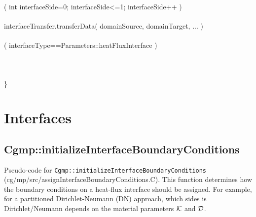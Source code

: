 \begin{flushleft}
\ia {} \\
\ia \FOR( int interfaceSide=0; interfaceSide<=1; interfaceSide++ ) \\
\ib \\
\ib    interfaceTransfer.transferData( domainSource, domainTarget,  ... ) \\
\ib \\
\ib    \IF( interfaceType==Parameters::heatFluxInterface ) \\
\ic      {} \\
\ib    \END \\
\ia \END \\
\}
\end{flushleft}


\clearpage
\section{Interfaces }

\subsection{Cgmp::initializeInterfaceBoundaryConditions}
Pseudo-code for {\tt Cgmp::initializeInterfaceBoundaryConditions} (cg/mp/src/assignInterfaceBoundaryConditions.C).
This function determines how the boundary conditions on a heat-flux interface should be assigned.
For example, for a  partitioned Dirichlet-Neumann (DN) approach, which sides is Dirichlet/Neumann depends
on the material parameters ${\mathcal K}$ and ${\mathcal D}$.

